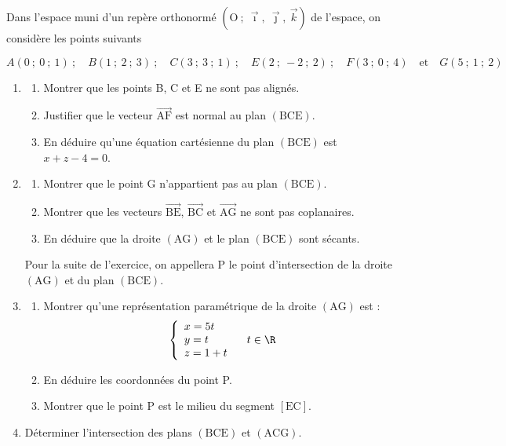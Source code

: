 Dans l'espace muni d'un repère orthonormé $\left(\text{O}~;~\vec{\imath},~\vec{\jmath},~\vec{k}\right)$ de l'espace, on considère les points suivants

\[A(0~;~0~;~1)~;\quad B(1~;~2~;~3)~;\quad C(3~;~3~;~1)~;\quad E(2~;~-2~;~2)~;\quad F(3~;~0~;~4)\quad \text{et}\quad G(5~;~1~;~2)
\]

\begin{enumerate}
\item \begin{enumerate}
\item Montrer que les points B, C et E ne sont pas alignés.
\item Justifier que le vecteur $\overrightarrow{\mathrm{AF}}$ est normal au plan $(\mathrm{BCE})$.
\item En déduire qu'une équation cartésienne du plan $(\mathrm{BCE})$ est $x+z-4=0$.
\end{enumerate}

\item \begin{enumerate}
\item Montrer que le point G n'appartient pas au plan $(\mathrm{BCE})$.
\item Montrer que les vecteurs $\overrightarrow{\mathrm{BE}}$, $\overrightarrow{\mathrm{BC}}$ et $\overrightarrow{\mathrm{AG}}$ ne sont pas coplanaires.
\item En déduire que la droite $(\mathrm{AG})$ et le plan $(\mathrm{BCE})$ sont sécants.
\end{enumerate}

Pour la suite de l'exercice, on appellera P le point d'intersection de la droite $(\mathrm{AG})$ et du plan $(\mathrm{BCE})$.

\item \begin{enumerate}
\item Montrer qu'une représentation paramétrique de la droite $(\mathrm{AG})$ est :
\[
\left\{
\begin{array}{l}
x=5t\\
y=t\\
z=1+t
\end{array}
\right.\quad t\in \R
\]
\item En déduire les coordonnées du point P.
\item Montrer que le point P est le milieu du segment $[\mathrm{EC}]$.
\end{enumerate}

\item Déterminer l'intersection des plans $(\mathrm{BCE})$ et $(\mathrm{ACG})$.
\end{enumerate}

